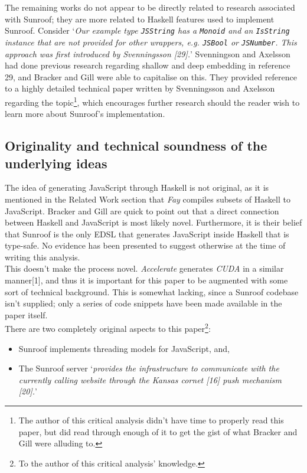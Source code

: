 \documentclass[9pt, twocolumn]{article}
\begin{document}
The remaining works do not appear to be directly related to research associated with Sunroof; they are more related to Haskell features used to implement Sunroof.
Consider `{\it Our example type \verb/JSString/ has a \verb/Monoid/ and an \verb/IsString/ instance that are not provided for other wrappers, e.g. \verb/JSBool/ or \verb/JSNumber/. This approach was first introduced by Svenningsson [29].}'
Svenningson and Axelsson had done previous research regarding shallow and deep embedding in reference 29, and Bracker and Gill were able to capitalise on this. They provided reference to a highly detailed technical paper written by Svenningsson and Axelsson regarding the topic\footnote{The author of this critical analysis didn't have time to properly read this paper, but did read through enough of it to get the gist of what Bracker and Gill were alluding to.}, which encourages further research should the reader wish to learn more about Sunroof's implementation.

\subsection*{Originality and technical soundness of the underlying ideas}
The idea of generating JavaScript through Haskell is not original, as it is mentioned in the Related Work section that {\it Fay} compiles subsets of Haskell to JavaScript.
Bracker and Gill are quick to point out that a direct connection between Haskell and JavaScript is most likely novel.
Furthermore, it is their belief that Sunroof is the only EDSL that generates JavaScript inside Haskell that is type-safe.
No evidence has been presented to suggest otherwise at the time of writing this analysis.\\

This doesn't make the process novel.
{\it Accelerate} generates {\it CUDA} in a similar manner[1], and thus it is important for this paper to be augmented with some sort of technical background.
This is somewhat lacking, since a Sunroof codebase isn't supplied; only a series of code snippets have been made available in the paper itself.\\

There are two completely original aspects to this paper\footnote{To the author of this critical analysis' knowledge.}:
\begin{itemize}
\item Sunroof implements threading models for JavaScript, and,
\item The Sunroof server `{\it provides the infrastructure to communicate with the currently calling website through the Kansas cornet [16] push mechanism [20].}'
\end{itemize}
\end{document}
